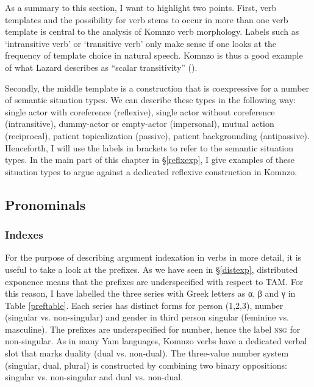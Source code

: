 \documentclass[output=paper]{langscibook}
\begin{document}
As a summary to this section, I want to highlight two points. First, verb templates and the possibility for verb stems to occur in more than one verb template is central to the analysis of Komnzo verb morphology. Labels such as `intransitive verb' or `transitive verb' only make sense if one looks at the frequency of template choice in natural speech. Komnzo is thus a good example of what Lazard describes as ``scalar transitivity'' (\citeyear[166]{Lazard2002}).

Secondly, the middle template is a construction that is coexpressive for a number of semantic situation types. We can describe these types in the following way: single actor with coreference (reflexive), single actor without coreference (intransitive), dummy-actor or empty-actor (impersonal), mutual action (reciprocal), patient topicalization (passive), patient backgrounding (antipassive). Henceforth, I will use the labels in brackets to refer to the semantic situation types. In the main part of this chapter in \S\ref{reflxexp}, I give examples of these situation types to argue against a dedicated reflexive construction in Komnzo. 
\subsection{Pronominals}\label{pronominals}
\subsubsection{Indexes}\label{prefixseries}
For the purpose of describing argument indexation in verbs in more detail, it is useful to take a look at the prefixes. As we have seen in \S\ref{distexp}, distributed exponence means that the prefixes are underspecified with respect to TAM. For this reason, I have labelled the three series with Greek letters as α, β and γ in Table \ref{preftable}. Each series has distinct forms for person (1,2,3), number (singular vs. non-singular) and gender in third person singular (feminine vs. masculine). The prefixes are underspecified for number, hence the label \textsc{nsg}{} for non-singular. As in many Yam languages, Komnzo verbs have a dedicated verbal slot that marks duality (dual vs. non-dual). The three-value number system (singular, dual, plural) is constructed by combining two binary oppositions: singular vs. non-singular and dual vs. non-dual.
\end{document}
